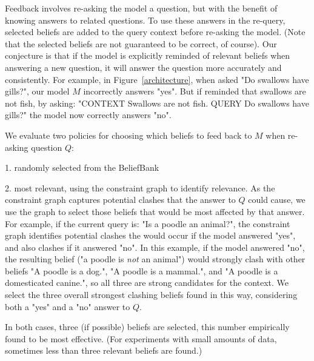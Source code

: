 \documentclass[11pt]{article}
\newenvironment{enu}{                   %
     \parskip 0cm \begin{list}{}{\parsep 0cm \itemsep 0cm \topsep 0cm}}{
       \end{list}} %
\begin{document}
Feedback involves re-asking the model a question, but with the benefit
of knowing answers to related questions. To use these answers in the re-query,
selected beliefs are added to the query context before re-asking the model.
(Note that the selected beliefs are not guaranteed to be correct, of course).
Our conjecture is that if the model is explicitly reminded of relevant beliefs when answering a new question,
it will answer the question more accurately and consistently.
For example, in Figure~\ref{architecture}, when asked "Do swallows have gills?", our model $M$ incorrectly answers "yes".
But if reminded that swallows are not fish, by asking: "CONTEXT Swallows are not fish. QUERY Do swallows have gills?" 
the model now correctly answers "no". 

We evaluate two policies for choosing which beliefs to feed back to $M$ when re-asking question $Q$:
\begin{enu}
\item[1.] randomly selected from the BeliefBank
\item[2.] most relevant, using the constraint graph to identify relevance. As the constraint graph captures potential clashes that the answer to  $Q$ could cause, we use the graph to select those beliefs that would be most affected by that answer. %
For example, if the current query is: "Is a poodle an animal?", the constraint graph identifies potential clashes the would occur if the model
answered "yes", and also clashes if it answered "no". In this example, if the model answered "no", the resulting belief ("a poodle is {\it not} an animal") would strongly clash with other beliefs "A poodle is a dog.", "A poodle is a mammal.", and "A poodle is a domesticated canine.", so all three are strong candidates for the context. We select the three overall strongest clashing beliefs found in this way, considering both a "yes" and a "no" answer to $Q$.
\end{enu}
In both cases, three (if possible) beliefs are selected, this number empirically found to be most effective. (For experiments with small amounts of data, sometimes less than three relevant beliefs are found.)
\end{document}
